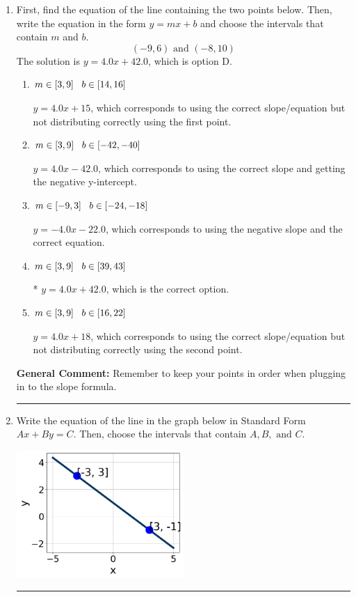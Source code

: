 \documentclass{extbook}[14pt]
\newcommand{\litem}[1]{\item #1

\rule{\textwidth}{0.4pt}}
\begin{document}
\begin{enumerate}\litem{
First, find the equation of the line containing the two points below. Then, write the equation in the form $ y=mx+b $ and choose the intervals that contain $m$ and $b$.
\[ (-9, 6) \text{ and } (-8, 10) \]The solution is \( y = 4.0x + 42.0 \), which is option D.\begin{enumerate}[label=\Alph*.]
\item \( m \in [3, 9] \hspace*{3mm} b \in [14, 16] \)

 $y = 4.0x + 15$, which corresponds to using the correct slope/equation but not distributing correctly using the first point.
\item \( m \in [3, 9] \hspace*{3mm} b \in [-42, -40] \)

 $y = 4.0x -42.0$, which corresponds to using the correct slope and getting the negative y-intercept.
\item \( m \in [-9, 3] \hspace*{3mm} b \in [-24, -18] \)

 $y = -4.0x -22.0$, which corresponds to using the negative slope and the correct equation.
\item \( m \in [3, 9] \hspace*{3mm} b \in [39, 43] \)

* $y = 4.0x + 42.0$, which is the correct option.
\item \( m \in [3, 9] \hspace*{3mm} b \in [16, 22] \)

 $y = 4.0x + 18$, which corresponds to using the correct slope/equation but not distributing correctly using the second point.
\end{enumerate}

\textbf{General Comment:} Remember to keep your points in order when plugging in to the slope formula.
}
\litem{
Write the equation of the line in the graph below in Standard Form $Ax+By=C$. Then, choose the intervals that contain $A, B, \text{ and } C$.

\begin{center}
    \includegraphics[width=0.5\textwidth]{../Figures/linearGraphToStandardCopyC.png}
\end{center}


}
\end{enumerate}
\end{document}
